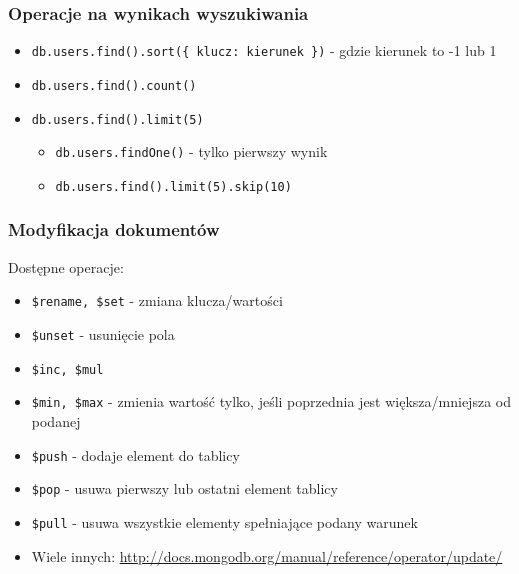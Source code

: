 \documentclass{beamer}
\begin{document}
  \begin{frame}
    \frametitle{Operacje na wynikach wyszukiwania}
    \begin{itemize}
      \item \texttt{db.users.find().sort(\{ klucz: kierunek \})} - gdzie kierunek to -1 lub 1
      \item \texttt{db.users.find().count()}
      \item \texttt{db.users.find().limit(5)}
      \begin{itemize}
        \item \texttt{db.users.findOne()} - tylko pierwszy wynik
        \item \texttt{db.users.find().limit(5).skip(10)}
      \end{itemize}
    \end{itemize}
  \end{frame}

  \begin{frame}
    \frametitle{Modyfikacja dokumentów}
    Dostępne operacje:
    \begin{itemize}
      \item \texttt{\$rename, \$set} - zmiana klucza/wartości
      \item \texttt{\$unset} - usunięcie pola
      \item \texttt{\$inc, \$mul}
      \item \texttt{\$min, \$max} - zmienia wartość tylko, jeśli poprzednia jest większa/mniejsza od podanej
      \item \texttt{\$push} - dodaje element do tablicy
      \item \texttt{\$pop} - usuwa pierwszy lub ostatni element tablicy
      \item \texttt{\$pull} - usuwa wszystkie elementy spełniające podany warunek
      \item Wiele innych: \url{http://docs.mongodb.org/manual/reference/operator/update/}
    \end{itemize}
  \end{frame}
\end{document}
